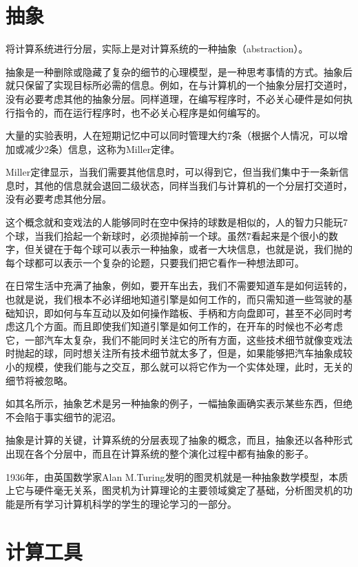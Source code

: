 \chapter{抽象}

将计算系统进行分层，实际上是对计算系统的一种抽象（abstraction）。

抽象是一种删除或隐藏了复杂的细节的心理模型，是一种思考事情的方式。抽象后就只保留了实现目标所必需的信息。例如，在与计算机的一个抽象分层打交道时，没有必要考虑其他的抽象分层。同样道理，在编写程序时，不必关心硬件是如何执行指令的，而在运行程序时，也不必关心程序是如何编写的。

大量的实验表明，人在短期记忆中可以同时管理大约7条（根据个人情况，可以增加或减少2条）信息，这称为Miller定律。

Miller定律显示，当我们需要其他信息时，可以得到它，但当我们集中于一条新信息时，其他的信息就会退回二级状态，同样当我们与计算机的一个分层打交道时，没有必要考虑其他分层。

这个概念就和变戏法的人能够同时在空中保持的球数是相似的，人的智力只能玩7个球，当我们拾起一个新球时，必须抛掉前一个球。虽然7看起来是个很小的数字，但关键在于每个球可以表示一种抽象，或者一大块信息，也就是说，我们抛的每个球都可以表示一个复杂的论题，只要我们把它看作一种想法即可。

在日常生活中充满了抽象，例如，要开车出去，我们不需要知道车是如何运转的，也就是说，我们根本不必详细地知道引擎是如何工作的，而只需知道一些驾驶的基础知识，即如何与车互动以及如何操作踏板、手柄和方向盘即可，甚至不必同时考虑这几个方面。而且即使我们知道引擎是如何工作的，在开车的时候也不必考虑它，一部汽车太复杂，我们不能同时关注它的所有方面，这些技术细节就像变戏法时抛起的球，同时想关注所有技术细节就太多了，但是，如果能够把汽车抽象成较小的规模，使我们能与之交互，那么就可以将它作为一个实体处理，此时，无关的细节将被忽略。

如其名所示，抽象艺术是另一种抽象的例子，一幅抽象画确实表示某些东西，但绝不会陷于事实细节的泥沼。

抽象是计算的关键，计算系统的分层表现了抽象的概念，而且，抽象还以各种形式出现在各个分层中，而且在计算系统的整个演化过程中都有抽象的影子。

1936年，由英国数学家Alan M.Turing发明的图灵机就是一种抽象数学模型，本质上它与硬件毫无关系，图灵机为计算理论的主要领域奠定了基础，分析图灵机的功能是所有学习计算机科学的学生的理论学习的一部分。

\chapter{计算工具}

